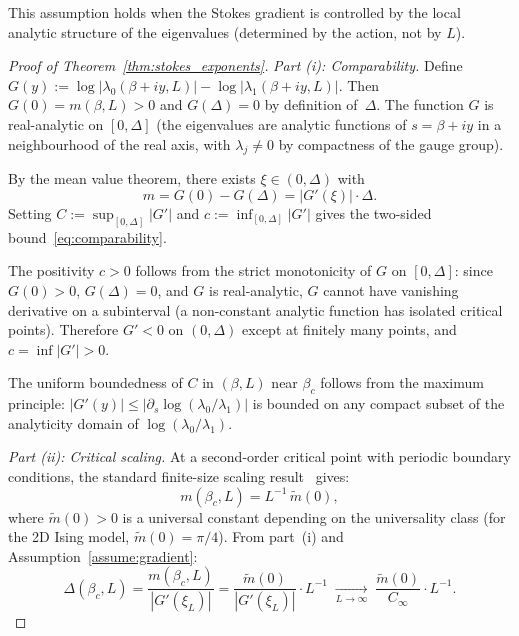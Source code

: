 \documentclass[12pt]{article}
\theoremstyle{definition}
\theoremstyle{remark}
\begin{document}
This assumption holds when the Stokes gradient is controlled by the
local analytic structure of the eigenvalues (determined by the action,
not by $L$).

\begin{proof}[Proof of Theorem~\ref{thm:stokes_exponents}]
\emph{Part (i): Comparability.}
Define $G(y) := \log|\lambda_0(\beta+iy,L)| -
\log|\lambda_1(\beta+iy,L)|$.  Then $G(0) = m(\beta,L) > 0$ and
$G(\Delta) = 0$ by definition of~$\Delta$.  The function $G$ is
real-analytic on $[0,\Delta]$ (the eigenvalues are analytic functions
of $s = \beta+iy$ in a neighbourhood of the real axis, with
$\lambda_j \ne 0$ by compactness of the gauge group).

By the mean value theorem, there exists $\xi \in (0,\Delta)$ with
\begin{equation}
m = G(0) - G(\Delta) = |G'(\xi)| \cdot \Delta.
\end{equation}
Setting $C := \sup_{[0,\Delta]}|G'|$ and $c := \inf_{[0,\Delta]}|G'|$
gives the two-sided bound~\eqref{eq:comparability}.

The positivity $c > 0$ follows from the strict monotonicity of $G$
on $[0,\Delta]$: since $G(0) > 0$, $G(\Delta) = 0$, and $G$ is
real-analytic, $G$ cannot have vanishing derivative on a subinterval
(a non-constant analytic function has isolated critical points).
Therefore $G' < 0$ on $(0,\Delta)$ except at finitely many points,
and $c = \inf|G'| > 0$.

The uniform boundedness of $C$ in $(\beta, L)$ near $\beta_c$ follows
from the maximum principle: $|G'(y)| \le |\partial_s\log(\lambda_0/\lambda_1)|$
is bounded on any compact subset of the analyticity domain of
$\log(\lambda_0/\lambda_1)$.

\emph{Part (ii): Critical scaling.}
At a second-order critical point with periodic boundary conditions,
the standard finite-size scaling
result~\cite{Fisher72,Barber83} gives:
\begin{equation}\label{eq:fss_gap}
m(\beta_c, L) = L^{-1}\,\tilde{m}(0),
\end{equation}
where $\tilde{m}(0) > 0$ is a universal constant depending on the
universality class (for the 2D Ising model,
$\tilde{m}(0) = \pi/4$).
From part~(i) and Assumption~\ref{assume:gradient}:
\[
\Delta(\beta_c, L) = \frac{m(\beta_c, L)}{|G'(\xi_L)|}
= \frac{\tilde{m}(0)}{|G'(\xi_L)|} \cdot L^{-1}
\;\xrightarrow[L\to\infty]{}\;
\frac{\tilde{m}(0)}{C_\infty} \cdot L^{-1}.
\]


\end{proof}
\end{document}
